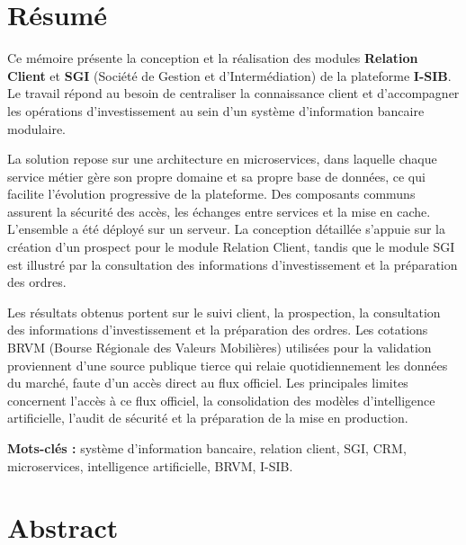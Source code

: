 \chapter*{Résumé}
{}

\hspace{0.5cm}
Ce mémoire présente la conception et la réalisation des modules
\textbf{Relation Client} et \textbf{SGI} (Société de Gestion et
d'Intermédiation) de la plateforme \textbf{I-SIB}. Le travail répond au besoin
de centraliser la connaissance client et d'accompagner les opérations
d'investissement au sein d'un système d'information bancaire modulaire.

\hspace{0.5cm}
La solution repose sur une architecture en microservices, dans laquelle chaque
service métier gère son propre domaine et sa propre base de données, ce qui
facilite l'évolution progressive de la plateforme. Des composants communs
assurent la sécurité des accès, les échanges entre services et la mise en cache.
L'ensemble a été déployé sur un serveur. La
conception détaillée s'appuie sur la création d'un prospect pour le module
Relation Client, tandis que le module SGI est illustré par la consultation des
informations d'investissement et la préparation des ordres.

\hspace{0.5cm}
Les résultats obtenus portent sur le suivi client, la prospection, la
consultation des informations d'investissement et la préparation des ordres. Les
cotations BRVM (Bourse Régionale des Valeurs Mobilières) utilisées pour la
validation proviennent d'une source publique tierce qui relaie quotidiennement
les données du marché, faute d'un accès direct au flux officiel. Les principales
limites concernent l'accès à ce flux officiel, la consolidation des modèles
d'intelligence artificielle, l'audit de sécurité et la préparation de la mise en
production.

\vspace{0.8cm}
\noindent
\textbf{Mots-clés :} système d'information bancaire, relation client, SGI,
CRM, microservices, intelligence artificielle, BRVM, I-SIB.

\cleardoublepage

\chapter*{Abstract}
{}

